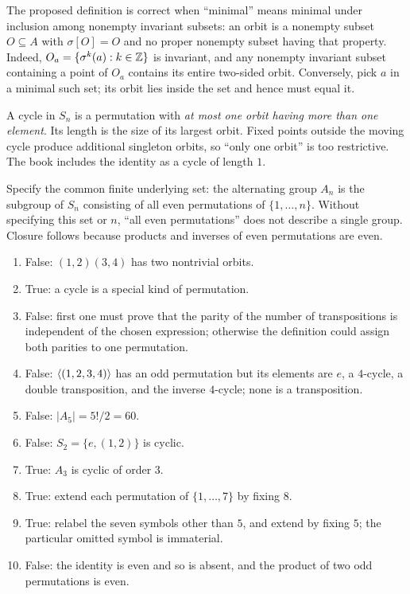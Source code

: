 The proposed definition is correct when ``minimal'' means minimal under inclusion among nonempty invariant subsets: an orbit is a nonempty subset $O\subseteq A$ with $\sigma[O]=O$ and no proper nonempty subset having that property. Indeed, $O_a=\{\sigma^k(a):k\in\mathbb{Z}\}$ is invariant, and any nonempty invariant subset containing a point of $O_a$ contains its entire two-sided orbit. Conversely, pick $a$ in a minimal such set; its orbit lies inside the set and hence must equal it.

A cycle in $S_n$ is a permutation with \emph{at most one orbit having more than one element}. Its length is the size of its largest orbit. Fixed points outside the moving cycle produce additional singleton orbits, so ``only one orbit'' is too restrictive. The book includes the identity as a cycle of length $1$.

Specify the common finite underlying set: the alternating group $A_n$ is the subgroup of $S_n$ consisting of all even permutations of $\{1,\ldots,n\}$. Without specifying this set or $n$, ``all even permutations'' does not describe a single group. Closure follows because products and inverses of even permutations are even.

\begin{enumerate}[label=(\alph*)]
\item False: $(1,2)(3,4)$ has two nontrivial orbits.
\item True: a cycle is a special kind of permutation.
\item False: first one must prove that the parity of the number of transpositions is independent of the chosen expression; otherwise the definition could assign both parities to one permutation.
\item False: $\langle (1,2,3,4)\rangle$ has an odd permutation but its elements are $e$, a $4$-cycle, a double transposition, and the inverse $4$-cycle; none is a transposition.
\item False: $|A_5|=5!/2=60$.
\item False: $S_2=\{e,(1,2)\}$ is cyclic.
\item True: $A_3$ is cyclic of order $3$.
\item True: extend each permutation of $\{1,\ldots,7\}$ by fixing $8$.
\item True: relabel the seven symbols other than $5$, and extend by fixing $5$; the particular omitted symbol is immaterial.
\item False: the identity is even and so is absent, and the product of two odd permutations is even.
\end{enumerate}

